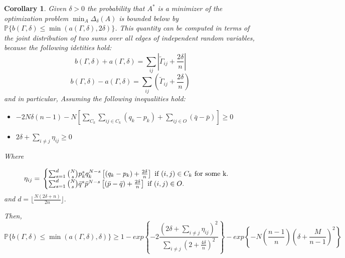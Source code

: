 \documentclass[12pt]{amsart}
\newtheorem{cor}[lemma]{Corollary}
\numberwithin{equation}{section}
\newcommand{\mv}[1]{{\color{red} \sf $\clubsuit\clubsuit\clubsuit$ Mauricio: [#1]}}
\begin{document}
\begin{cor} Given $\delta>0$ the probability that $A^*$ is a minimizer of the optimization problem $\min_A\Delta_{\delta}(A)$ is bounded below by $\mathbb{P}\{ b(\Gamma,\delta)\leq \min \left(a(\Gamma,\delta), 2\delta\right)\}$.  
This quantity can be computed in terms of the joint distribution of two sums over all edges of independent random variables, because the following idetities hold:
\[b(\Gamma,\delta)+a(\Gamma,\delta)=\sum_{ij} \left|\widetilde{\Gamma}_{ij}+\frac{2\delta}{n}\right|\]
\[b(\Gamma,\delta)-a(\Gamma,\delta)=\sum_{ij} \left(\widetilde{\Gamma}_{ij}+\frac{2\delta}{n}\right)\]
and in particular, 
Assuming the following inequalities hold:
\begin{itemize}
\item  $- 2N\delta(n-1)-N \left [\sum_{C_k} \sum_{ij \in C_k}(q_k-p_k)+ \sum_{ij \in O}(\bar{q}-\bar{p}) \right ] \geq 0$
\item $2\delta + \sum_{i\neq j}\eta_{ij} \geq 0$
\end{itemize}
Where

\[
\eta_{ij}= {}\begin{cases}
\sum_{s=1}^d \binom{N}{s}p_k^sq_k^{N-s}\left [(q_k-p_k)+\frac{2\delta}{n}\right ] \text{ if } (i,j) \in C_k \text{ for some k}. \cr
\sum_{s=1}^d \binom{N}{s}\bar{q}^s\bar{p}^{N-s}\left [(\bar{p}-\bar{q})+\frac{2\delta}{n}\right ] \text{ if  }(i,j)\in O.
\end{cases}
\]
and  $d =  \lfloor\frac{N(2\delta+n)}{2n}\rfloor.$

Then,
\[\mathbb{P}\{ b(\Gamma,\delta)\leq \min \left(a(\Gamma,\delta), \delta\right)\}\geq
1- exp \left \{-2 \frac{\left (2\delta + \sum_{i\neq j}\eta_{ij}\right )^2}{\sum_{i\neq j}(2+\frac{4\delta}{n})^2}     \right \} - 
exp\left\{-N \left ( \frac{n-1}{n} \right ) \left (\delta +\frac{M}{n-1}\right )^2 \right\}
\]  
\end{cor}
\end{document}
